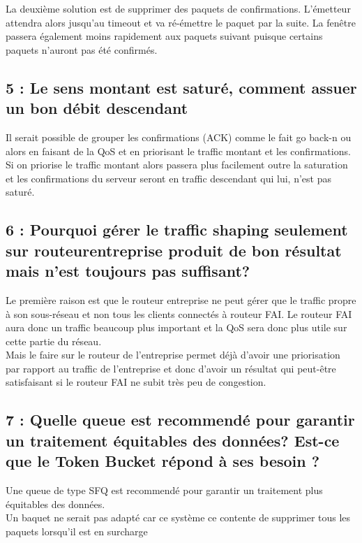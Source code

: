 \documentclass{article}
\begin{document}
La deuxième solution  est de supprimer des paquets de confirmations. L'émetteur attendra alors jusqu'au timeout et va ré-émettre le paquet par la suite. La fenêtre passera également moins rapidement aux paquets suivant puisque certains paquets n'auront pas été confirmés.

\subsection*{5 : Le sens montant est saturé, comment assuer un bon débit descendant}

Il serait possible de grouper les confirmations (ACK) comme le fait go back-n\cite{GoBackN} ou alors en faisant de la QoS et en priorisant le traffic montant et les confirmations.\\

Si on priorise le traffic montant alors passera plus facilement outre la saturation et les confirmations du serveur seront en traffic descendant qui lui, n'est pas saturé.


\subsection*{6 : Pourquoi gérer le traffic shaping seulement sur routeurentreprise produit de bon résultat mais n'est toujours pas suffisant?}

Le première raison est que le routeur entreprise ne peut gérer que le traffic propre à son sous-réseau et non tous les clients connectés à routeur FAI. Le routeur FAI aura donc un traffic beaucoup plus important et la QoS sera donc plus utile sur cette partie du réseau.\\

Mais le faire sur le routeur de l'entreprise permet déjà d'avoir une priorisation par rapport au traffic de l'entreprise et donc d'avoir un résultat qui peut-être satisfaisant si le routeur FAI ne subit très peu de congestion.

\subsection*{7 : Quelle queue est recommendé pour garantir un traitement équitables des données? Est-ce que le Token Bucket répond à ses besoin ?}

Une queue de type SFQ \cite{SFQ} est recommendé pour garantir un traitement plus équitables des données.\\

Un baquet ne serait pas adapté car ce système ce contente de supprimer tous les paquets lorsqu'il est en surcharge \cite{Bucket}
\end{document}
